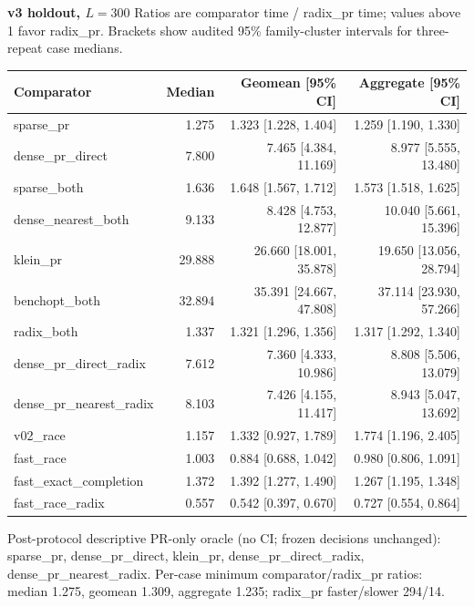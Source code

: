 \par\noindent\textbf{v3 holdout, $L=300$}
Ratios are comparator time / radix\_pr time; values above 1 favor radix\_pr.
Brackets show audited 95\% family-cluster intervals for three-repeat case medians.
\par\smallskip
\begin{tabular}{lrrr}
Comparator & Median & Geomean [95\% CI] & Aggregate [95\% CI] \\
\hline
sparse\_pr & 1.275 & 1.323 [1.228, 1.404] & 1.259 [1.190, 1.330] \\
dense\_pr\_direct & 7.800 & 7.465 [4.384, 11.169] & 8.977 [5.555, 13.480] \\
sparse\_both & 1.636 & 1.648 [1.567, 1.712] & 1.573 [1.518, 1.625] \\
dense\_nearest\_both & 9.133 & 8.428 [4.753, 12.877] & 10.040 [5.661, 15.396] \\
klein\_pr & 29.888 & 26.660 [18.001, 35.878] & 19.650 [13.056, 28.794] \\
benchopt\_both & 32.894 & 35.391 [24.667, 47.808] & 37.114 [23.930, 57.266] \\
radix\_both & 1.337 & 1.321 [1.296, 1.356] & 1.317 [1.292, 1.340] \\
dense\_pr\_direct\_radix & 7.612 & 7.360 [4.333, 10.986] & 8.808 [5.506, 13.079] \\
dense\_pr\_nearest\_radix & 8.103 & 7.426 [4.155, 11.417] & 8.943 [5.047, 13.692] \\
v02\_race & 1.157 & 1.332 [0.927, 1.789] & 1.774 [1.196, 2.405] \\
fast\_race & 1.003 & 0.884 [0.688, 1.042] & 0.980 [0.806, 1.091] \\
fast\_exact\_completion & 1.372 & 1.392 [1.277, 1.490] & 1.267 [1.195, 1.348] \\
fast\_race\_radix & 0.557 & 0.542 [0.397, 0.670] & 0.727 [0.554, 0.864] \\
\end{tabular}
\par\smallskip
Post-protocol descriptive PR-only oracle (no CI; frozen decisions unchanged): sparse\_pr, dense\_pr\_direct, klein\_pr, dense\_pr\_direct\_radix, dense\_pr\_nearest\_radix.
Per-case minimum comparator/radix\_pr ratios: median 1.275, geomean 1.309, aggregate 1.235; radix\_pr faster/slower 294/14.
